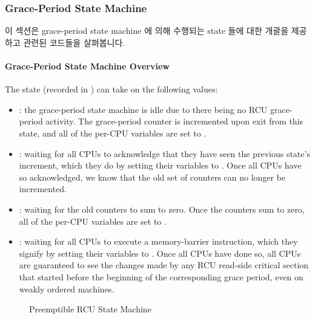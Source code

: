 \subsubsection{Grace-Period State Machine}
\label{app:rcuimpl:Grace-Period State Machine}

이 섹션은 grace-period state machine 에 의해 수행되는 state 들에 대한 개괄을
제공하고 관련된 코드들을 살펴봅니다.

\paragraph{Grace-Period State Machine Overview}
\label{app:rcuimpl:Grace-Period State Machine Overview}

The state (recorded in )
can take on the following values:

\begin{itemize}
\item	{}:  the grace-period state
	machine is idle due to there being no RCU grace-period activity.
	The  grace-period counter
	is incremented upon exit from this state, and all of the
	per-CPU  variables are set
	to .
\item	{}:
	waiting for all CPUs to acknowledge that they have seen the
	previous state's increment, which they do by setting their
	 variables to .
	Once all CPUs have so acknowledged, we know that the old
	set of counters can no longer be incremented.
\item	{}:
	waiting for the old counters to sum to zero.
	Once the counters sum to zero, all of the per-CPU
	 variables are set to
	.
\item	{}:
	waiting for all CPUs to execute a memory-barrier instruction,
	which they signify by setting their 
	variables to .
	Once all CPUs have done so, all CPUs are guaranteed to see
	the changes made by any RCU read-side critical section that
	started before the beginning of the corresponding grace period,
	even on weakly ordered machines.
\end{itemize}

\begin{figure}[htb]
\centering
{}
\caption{Preemptible RCU State Machine}
\label{app:rcuimpl:Preemptible RCU State Machine}
\end{figure}

